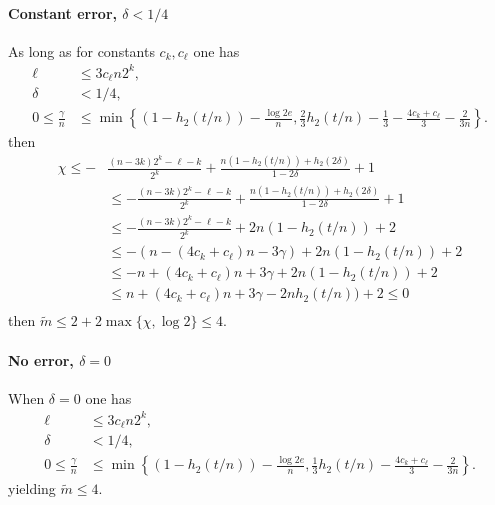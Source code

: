 \paragraph{Constant error, $\delta<1/4$} 
As long as for constants $c_k, c_\ell$ one has
\begin{align*}
\ell&\le 3c_\ell n2^k,\\
\delta &< 1/4,\\
0\le\frac{\gamma}{n} &\le \min\left\{(1-h_2(t/n)) - \frac{\log{2e}}{n}, \frac{2}{3}h_2(t/n)-\frac{1}{3}-\frac{4c_k+c_\ell}{3}-\frac{2}{3n}\right\}.
\end{align*} then 
\begin{align*}
\chi\le-&\frac{(n-3k)2^k-\ell-k}{2^k} + \frac{n(1-h_2(t/n)) +h_2(2\delta)}{1-2\delta}+1\\
&\le -\frac{(n-3k)2^k-\ell-k}{2^k} + \frac{n(1-h_2(t/n)) +h_2(2\delta)}{1-2\delta}+1 \\
&\le -\frac{(n-3k)2^k-\ell-k}{2^k} + 2n(1-h_2(t/n)) +2\\
 &\le -(n-(4c_k+c_\ell)n - 3\gamma) + 2n(1-h_2(t/n)) +2\\
&\le -n+(4c_k+c_\ell)n+3\gamma + 2n(1-h_2(t/n))+2 \\\
&\le n+(4c_k+c_\ell)n+3\gamma -2nh_2(t/n))+2 \le 0\\
\end{align*}
then $\tilde{m} \le 2+2\max\{\chi, \log{2}\} \le 4$.

\paragraph{No error, $\delta=0$}
When $\delta = 0$ one has
\begin{align*}
\ell&\le 3c_\ell n2^k,\\
\delta &< 1/4,\\
0\le\frac{\gamma}{n} &\le \min\left\{(1-h_2(t/n)) - \frac{\log{2e}}{n}, \frac{1}{3}h_2(t/n)-\frac{4c_k+c_\ell}{3}-\frac{2}{3n}\right\}.
\end{align*} 
yielding $\tilde{m}\le 4$.
